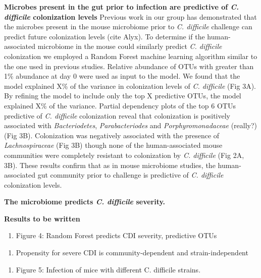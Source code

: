 \documentclass[11pt,]{article}
\begin{document}
\textbf{Microbes present in the gut prior to infection are predictive of
\emph{C. difficile} colonization levels} Previous work in our group has
demonstrated that the microbes present in the mouse microbiome prior to
\emph{C. difficile} challenge can predict future colonization levels
(cite Alyx). To determine if the human-associated microbiome in the
mouse could similarly predict \emph{C. difficile} colonization we
employed a Random Forest machine learning algorithm similar to the one
used in previous studies. Relative abundance of OTUs with greater than
1\% abundance at day 0 were used as input to the model. We found that
the model explained X\% of the variance in colonization levels of
\emph{C. difficile} (Fig 3A). By refining the model to include only the
top X predictive OTUs, the model explained X\% of the variance. Partial
dependency plots of the top 6 OTUs predictive of \emph{C. difficile}
colonization reveal that colonization is positively associated with
\emph{Bacteriodetes}, \emph{Parabacteriodes} and
\emph{Porphyromonadaceae} (really?) (Fig 3B). Colonization was
negatively associated with the presence of \emph{Lachnospiraceae} (Fig
3B) though none of the human-associated mouse communities were
completely resistant to colonization by \emph{C. difficile} (Fig 2A,
3B). These results confirm that as in mouse microbiome studies, the
human-associated gut community prior to challenge is predictive of
\emph{C. difficile} colonization levels.

\textbf{The microbiome predicts \emph{C. difficile} severity.}

\textbf{Results to be written}

\begin{enumerate}
\def\labelenumi{\alph{enumi}.}
\setcounter{enumi}{1}
\itemsep1pt\parskip0pt
\item
  Figure 4: Random Forest predicts CDI severity, predictive OTUs
\end{enumerate}

\begin{enumerate}
\def\labelenumi{\arabic{enumi}.}
\setcounter{enumi}{1}
\itemsep1pt\parskip0pt
\item
  Propensity for severe CDI is community-dependent and
  strain-independent
\end{enumerate}

\begin{enumerate}
\def\labelenumi{\alph{enumi}.}
\itemsep1pt\parskip0pt
\item
  Figure 5: Infection of mice with different C. difficile strains.
\end{enumerate}
\end{document}
